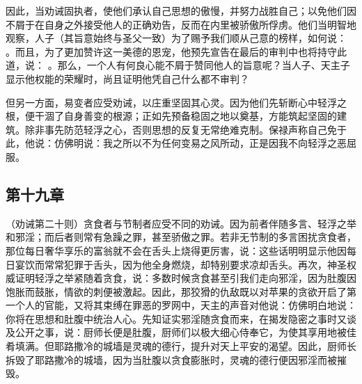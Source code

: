 因此，当劝诫固执者，使他们承认自己思想的傲慢，并努力战胜自己；以免他们因不屑于在自身之外接受他人的正确劝告，反而在内里被骄傲所俘虏。他们当明智地观察，人子（其旨意始终与圣父一致）为了赐予我们顺从己意的榜样，如何说： 。而且，为了更加赞许这一美德的恩宠，他预先宣告在最后的审判中也将持守此道，说： 。那么，一个人有何良心能不屑于赞同他人的旨意呢？当人子、天主子显示他权能的荣耀时，尚且证明他凭自己什么都不审判？\par

但另一方面，易变者应受劝诫，以庄重坚固其心灵。因为他们先斩断心中轻浮之根，便干涸了自身善变的根源；正如先预备稳固之地以奠基，方能筑起坚固的建筑。除非事先防范轻浮之心，否则思想的反复无常绝难克制。保禄声称自己免于此，他说：仿佛明说：我之所以不为任何变易之风所动，正是因我不向轻浮之恶屈服。\par


\subsection{第十九章}

\par

（劝诫第二十则）贪食者与节制者应受不同的劝诫。因为前者伴随多言、轻浮之举和邪淫；而后者则常有急躁之罪，甚至骄傲之罪。若非无节制的多言困扰贪食者，那位每日奢华享乐的富翁就不会在舌头上烧得更厉害，说：这些话明明显示他因每日宴饮而常常犯罪于舌头，因为他全身燃烧，却特别要求凉却舌头。再次，神圣权威证明轻浮之举紧随着贪食，说：多数时候贪食甚至引我们走向邪淫，因为肚腹因饱胀而鼓胀，情欲的刺便被激起。因此，那狡猾的仇敌既以对苹果的贪欲开启了第一个人的官能，又将其束缚在罪恶的罗网中，天主的声音对他说：仿佛明白地说：你将在思想和肚腹中统治人心。先知证实邪淫随贪食而来，在揭发隐密之事时又谈及公开之事，说：厨师长便是肚腹，厨师们以极大细心侍奉它，为使其享用地被佳肴填满。但耶路撒冷的城墙是灵魂的德行，提升对天上平安的渴望。因此，厨师长拆毁了耶路撒冷的城墙，因为当肚腹以贪食膨胀时，灵魂的德行便因邪淫而被摧毁。\par

